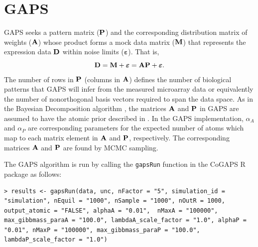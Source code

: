 \documentclass{report}
\begin{document}
\section{GAPS} \label{GAPSRun}

\par GAPS seeks a pattern matrix (${\bf{P}}$) and the corresponding distribution matrix of weights (${\bf{A}}$) whose product forms a mock data matrix (${\bf{M}}$) that represents the expression data ${\bf{D}}$ within noise limits ($\boldsymbol{\varepsilon}$).  That is,
\begin{equation}
{\bf{D}} = {\bf{M}} + \boldsymbol{\varepsilon} = {\bf{A}}{\bf{P}} + \boldsymbol{\varepsilon}.
\label{eq:matrixDecomp}
\end{equation}
The number of rows in ${\bf{P}}$ (columns in ${\bf{A}}$) defines the number of biological patterns that GAPS will infer from the measured microarray data or equivalently the number of nonorthogonal basis vectors required to span the data space.  As in the Bayesian Decomposition algorithm \cite{Ochs2006}, the matrices ${\bf{A}}$ and ${\bf{P}}$ in GAPS are assumed to have the atomic prior described in \cite{Sibisi1997}.  In the GAPS implementation, $\alpha_{A}$ and $\alpha_{P}$ are corresponding parameters for the expected number of atoms which map to each matrix element in ${\bf{A}}$ and ${\bf{P}}$, respectively.  The corresponding matrices ${\bf{A}}$ and ${\bf{P}}$ are found by MCMC sampling.

\par The GAPS algorithm is run by calling the \texttt{gapsRun} function in the CoGAPS R package as follows:
\begin{verbatim}
> results <- gapsRun(data, unc, nFactor = "5", simulation_id = "simulation", nEquil = "1000", nSample = "1000", nOutR = 1000, output_atomic = "FALSE", alphaA = "0.01",  nMaxA = "100000", max_gibbmass_paraA = "100.0", lambdaA_scale_factor = "1.0", alphaP = "0.01", nMaxP = "100000", max_gibbmass_paraP = "100.0", lambdaP_scale_factor = "1.0")
\end{verbatim}
\end{document}
